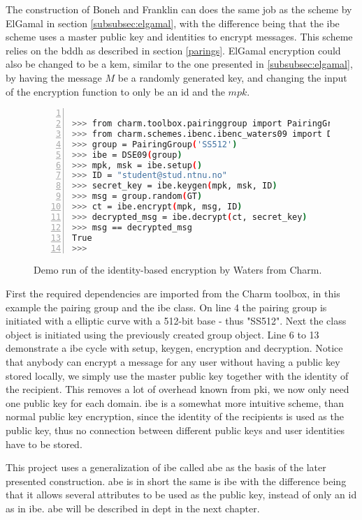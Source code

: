 \par The construction of Boneh and Franklin can does the same job as the scheme by ElGamal in section \ref{subsubsec:elgamal}, with the difference being that the \gls{ibe} scheme uses a master public key and identities to encrypt messages. This scheme relies on the \gls{bddh} as described in section \ref{parings}. ElGamal encryption could also be changed to be a \gls{kem}, similar to the one presented in \ref{subsubsec:elgamal}, by having the message $M$ be a randomly generated key, and changing the input of the encryption function to only be an id and the $mpk$.



\begin{figure}[H]
\begin{lstlisting}[language=bash, xleftmargin=2em, frame=single, framexleftmargin=1.5em, breaklines=true, numbers=left, numbersep=5pt, numberstyle=\tiny\color{mygray}]

>>> from charm.toolbox.pairinggroup import PairingGroup, GT
>>> from charm.schemes.ibenc.ibenc_waters09 import DSE09
>>> group = PairingGroup('SS512')
>>> ibe = DSE09(group)
>>> mpk, msk = ibe.setup()
>>> ID = "student@stud.ntnu.no"
>>> secret_key = ibe.keygen(mpk, msk, ID)
>>> msg = group.random(GT)
>>> ct = ibe.encrypt(mpk, msg, ID)
>>> decrypted_msg = ibe.decrypt(ct, secret_key)
>>> msg == decrypted_msg
True
>>> 

\end{lstlisting}
\caption{Demo run of the identity-based encryption by Waters from Charm.}
\label{fig:ibenc}
\end{figure}

First the required dependencies are imported from the Charm toolbox, in this example the pairing group and the \gls{ibe} class. On line 4 the pairing group is initiated with a elliptic curve with a 512-bit base - thus "SS512". Next the class object is initiated using the previously created group object. Line 6 to 13 demonstrate a \gls{ibe} cycle with setup, keygen, encryption and decryption.
Notice that anybody can encrypt a message for any user without having a public key stored locally, we simply use the master public key together with the identity of the recipient. This removes a lot of overhead known from \gls{pki}, we now only need one public key for each domain. \Gls{ibe} is a somewhat more intuitive scheme, than normal public key encryption, since the identity of the recipients is used as the public key, thus no connection between different public keys and user identities have to be stored.
\par This project uses a generalization of \gls{ibe} called \gls{abe} as the basis of the later presented construction. \Gls{abe} is in short the same is \gls{ibe} with the difference being that it allows several attributes to be used as the public key, instead of only an id as in \gls{ibe}. \Gls{abe} will be described in dept in the next chapter.

